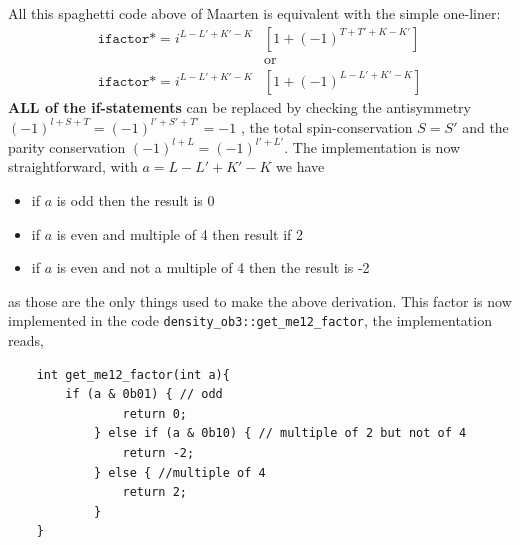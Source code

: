 \documentclass[10pt]{article}
\begin{document}
All this spaghetti code above of Maarten is equivalent with the simple one-liner:
\begin{align*}
\texttt{ifactor} *= i^{L-L'+K'-K} & \left[ 1 + (-1)^{T+T'+K-K'} \right] \\
& \text{or} \\
\texttt{ifactor} *= i^{L-L'+K'-K} & \left[ 1 + (-1)^{L-L'+K'-K} \right]  
\end{align*}
\textbf{ALL of the if-statements} can be replaced by checking the antisymmetry 
$(-1)^{l+S+T} = (-1)^{l'+S'+T'} = -1$ , the total spin-conservation $S=S'$ and the parity conservation $(-1)^{l+L}=(-1)^{l'+L'}$.
The implementation is now straightforward, with $a=L-L'+K'-K$ we have
\begin{itemize}
	\item if $a$ is odd then the result is 0 
	\item if $a$ is even and multiple of 4 then result if 2
	\item if $a$ is even and not a multiple of 4 then the result is -2
\end{itemize}
as those are the only things used to make the above derivation.
This factor is now implemented in the code \texttt{density\_ob3::get\_me12\_factor}, the implementation reads,
\begin{verbatim}
	int get_me12_factor(int a){
        if (a & 0b01) { // odd
        	    return 0;
        	} else if (a & 0b10) { // multiple of 2 but not of 4
        	    return -2;
        	} else { //multiple of 4
        	    return 2; 
        	}
    }
\end{verbatim}
\end{document}

